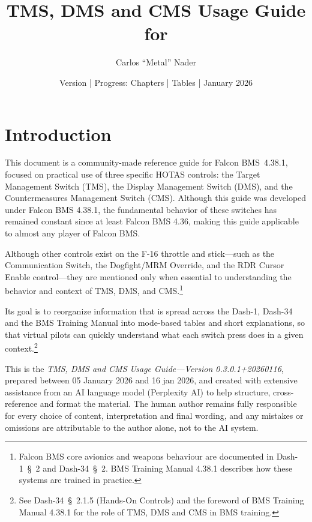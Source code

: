 \documentclass[11pt,a4paper]{article}
\title{TMS, DMS and CMS Usage Guide for \bmsver}
\author{Carlos ``Metal'' Nader}
\date{Version \fulldocversion{} | Progress: Chapters \chapterscompletedof{} | Tables \tablesfilledpct{} | January 2026}
\providecommand{\dashref}[1]{Dash-34~\S~#1}
\providecommand{\dashone}[1]{Dash-1~\S~#1}
\providecommand{\trnman}{BMS Training Manual 4.38.1}
\providecommand{\bmsver}{Falcon BMS~4.38.1}
\newcommand{\docversion}{0.3.0.1} %
\newcommand{\docbuild}{20260116}
\newcommand{\docstartdate}{05 January 2026}
\newcommand{\docenddate}{16 jan 2026}
\newcommand{\fulldocversion}{\docversion+\docbuild} %
\begin{document}
\maketitle

\newpage
\tableofcontents
\newpage
{}

\section{Introduction}

This document is a community-made reference guide for \bmsver, focused on practical use of three specific HOTAS controls: the Target Management Switch (TMS), the Display Management Switch (DMS), and the Countermeasures Management Switch (CMS). Although this guide was developed under Falcon BMS 4.38.1, the fundamental behavior of these switches has remained constant since at least Falcon BMS 4.36, making this guide applicable to almost any player of Falcon BMS.

Although other controls exist on the F-16 throttle and stick---such as the Communication Switch, the Dogfight/MRM Override, and the RDR Cursor Enable control---they are mentioned only when essential to understanding the behavior and context of TMS, DMS, and CMS.\footnote{Falcon BMS core avionics and weapons behaviour are documented in \dashone{2} and \dashref{2}. \trnman{} describes how these systems are trained in practice.}

Its goal is to reorganize information that is spread across the Dash-1, Dash-34 and the BMS Training Manual into mode-based tables and short explanations, so that virtual pilots can quickly understand what each switch press does in a given context.\footnote{See \dashref{2.1.5} (Hands-On Controls) and the foreword of \trnman{} for the role of TMS, DMS and CMS in BMS training.}

This is the \emph{TMS, DMS and CMS Usage Guide---Version \fulldocversion}, prepared between \docstartdate{} and \docenddate{}, and created with extensive assistance from an AI language model (Perplexity AI) to help structure, cross-reference and format the material. The human author remains fully responsible for every choice of content, interpretation and final wording, and any mistakes or omissions are attributable to the author alone, not to the AI system.
\end{document}

